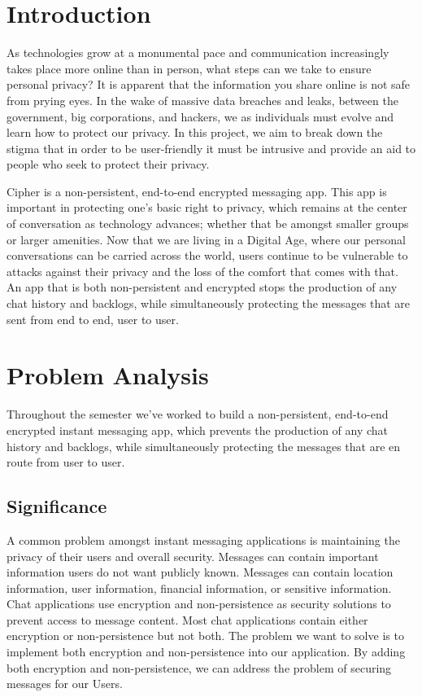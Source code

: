 \documentclass[12pt]{article}
\begin{document}
\section{Introduction} \label{chap:introduction}
As technologies grow at a monumental pace and communication increasingly takes place more online than in person, what steps can we take to ensure personal privacy? It is apparent that the information you share online is not safe from prying eyes. In the wake of massive data breaches and leaks, between the government, big corporations, and hackers, we as individuals must evolve and learn how to protect our privacy. In this project, we aim to break down the stigma that in order to be user-friendly it must be intrusive and provide an aid to people who seek to protect their privacy.

 
Cipher is a non-persistent, end-to-end encrypted messaging app. This app is important in protecting one’s basic right to privacy, which remains at the center of conversation as technology advances; whether that be amongst smaller groups or larger amenities. Now that we are living in a Digital Age, where our personal conversations can be  carried across the world, users continue to be vulnerable to attacks against their privacy and the loss of the comfort that comes with that.  An app that is both non-persistent and encrypted stops the production of any chat history and backlogs, while simultaneously protecting the messages that are sent from end to end, user to user.

\section {Problem Analysis}
Throughout the semester we've worked to build a non-persistent, end-to-end encrypted instant messaging app, which prevents the production of any chat history and backlogs, while simultaneously protecting the messages that are en route from user to user.
\vspace{0.25cm}
    
\subsection{Significance}
A common problem amongst instant messaging applications is maintaining the privacy of their users and overall security. Messages can contain important information users do not want publicly known. Messages can contain location information, user information, financial information, or sensitive information. Chat applications use encryption and non-persistence as security solutions to prevent access to message content. Most chat applications contain either encryption or non-persistence but not both. The problem we want to solve is to implement both encryption and non-persistence into our application. By adding both encryption and non-persistence, we can address the problem of securing messages for our Users.  
\vspace{0.5cm}
\end{document}
